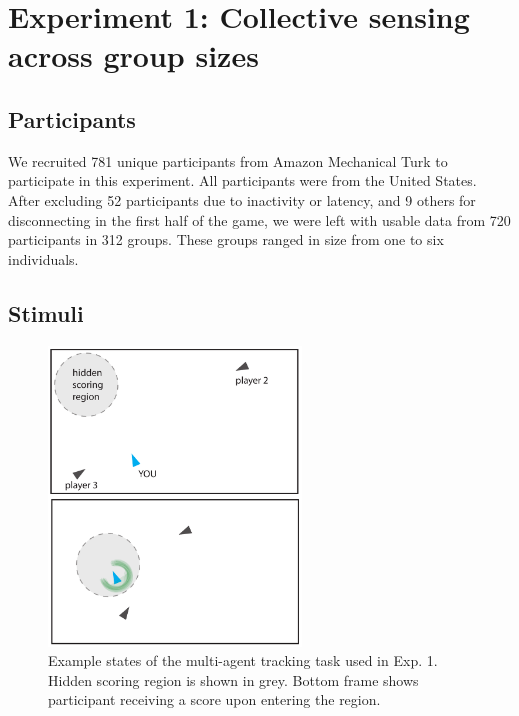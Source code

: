 \documentclass[12pt,letterpaper]{article}
\begin{document}



\section{Experiment 1: Collective sensing across group sizes}

\subsection{Participants}
We recruited 781 unique participants from Amazon Mechanical Turk to participate in this experiment.  All participants were from the United States.  After excluding 52 participants due to inactivity or latency, and 9 others for disconnecting in the first half of the game, we were left with usable data from 720 participants in 312 groups.  These groups ranged in size from one to six individuals. 

\subsection{Stimuli}

\begin{figure}[t!]
  \centering
  \includegraphics[width=0.6\textwidth]{./figures/experiment1_design.pdf}
  \hspace{0.1cm}
  \caption{Example states of the multi-agent tracking task used in Exp. 1. Hidden scoring region is shown in grey. Bottom frame shows participant receiving a score upon entering the region.}
  \label{fig:score}
\end{figure}
\end{document}
